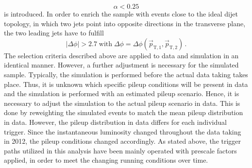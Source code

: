 \begin{equation*}
\alpha < 0.25 
\end{equation*}
is introduced. In order to enrich the sample with events close to the ideal dijet topology, in which two jets point into opposite directions in the transverse plane, the two leading jets have to fulfill 
\begin{equation}
|\Delta \phi| > 2.7 \; \mathrm{with} \; \Delta \phi = \Delta \phi(\vec{p}_\mathrm{T,1}, \vec{p}_\mathrm{T,2}) \, .
\end{equation}  
The selection criteria described above are applied to data and simulation in an identical manner. However, a further adjustment is necessary for the simulated sample. Typically, the simulation is performed before the actual data taking takes place. Thus, it is unknown which specific pileup conditions will be present in data and the simulation is performed with an estimated pileup scenario. Hence, it is necessary to adjust the simulation to the actual pileup scenario in data. This is done by reweighting the simulated events to match the mean pileup distribution in data. However, the pileup distribution in data differs for each individual trigger. Since the instantaneous luminosity changed throughout the data taking in 2012, the pileup conditions changed accordingly. As stated above, the trigger paths utilized in this analysis have been mainly operated with prescale factors applied, in order to meet the changing running conditions over time. 
